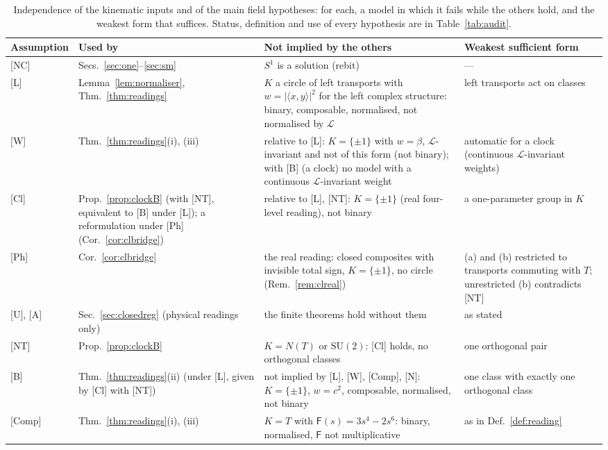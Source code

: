 \documentclass[aps,pra,onecolumn,superscriptaddress,nofootinbib,10pt]{revtex4-2}
\theoremstyle{definition}
\theoremstyle{remark}
\newcommand{\cL}{\mathcal{L}}
\newcommand{\ip}[2]{\langle #1,#2\rangle}
\newcommand{\SU}{\mathrm{SU}}
\begin{document}
\begin{table}[h]
\caption{Independence of the kinematic inputs and of the main field hypotheses: for each, a model in which it fails while the others hold, and the weakest form that suffices.  Status, definition and use of every hypothesis are in Table~\ref{tab:audit}.}
\label{tab:independence}
\footnotesize
\begin{tabular}{@{}p{}p{}p{}p{}@{}}
\toprule
Assumption & Used by & Not implied by the others & Weakest sufficient form\\
\midrule
{[NC]} & Secs.~\ref{sec:one}--\ref{sec:sm} & $S^1$ is a solution (rebit) & ---\\
{[L]} & Lemma~\ref{lem:normaliser}, Thm.~\ref{thm:readings} & $K$ a circle of left transports with $w=\lvert\ip xy\rvert^2$ for the left complex structure: binary, composable, normalised, not normalised by $\cL$ & left transports act on classes\\
{[W]} & Thm.~\ref{thm:readings}(i), (iii) & relative to [L]: $K=\{\pm1\}$ with $w=\beta$, $\cL$-invariant and not of this form (not binary); with [B] (a clock) no model with a continuous $\cL$-invariant weight & automatic for a clock (continuous $\cL$-invariant weights)\\
{[Cl]} & Prop.~\ref{prop:clockB} (with [NT], equivalent to [B] under [L]); a reformulation under [Ph] (Cor.~\ref{cor:clbridge}) & relative to [L], [NT]: $K=\{\pm1\}$ (real four-level reading), not binary & a one-parameter group in $K$\\
{[Ph]} & Cor.~\ref{cor:clbridge} & the real reading: closed composites with invisible total sign, $K=\{\pm1\}$, no circle (Rem.~\ref{rem:clreal}) & (a) and (b) restricted to transports commuting with $T$; unrestricted (b) contradicts [NT]\\
{[U]}, {[A]} & Sec.~\ref{sec:closedreg} (physical readings only) & the finite theorems hold without them & as stated\\
{[NT]} & Prop.~\ref{prop:clockB} & $K=N(T)$ or $\SU(2)$: [Cl] holds, no orthogonal classes & one orthogonal pair\\
{[B]} & Thm.~\ref{thm:readings}(ii) (under [L], given by [Cl] with [NT]) & not implied by [L], [W], [Comp], [N]: $K=\{\pm1\}$, $w=c^2$, composable, normalised, not binary & one class with exactly one orthogonal class\\
{[Comp]} & Thm.~\ref{thm:readings}(i), (iii) & $K=T$ with $\mathsf F(s)=3s^4-2s^6$: binary, normalised, $\mathsf F$ not multiplicative & as in Def.~\ref{def:reading}\\

\end{tabular}
\end{table}
\end{document}
